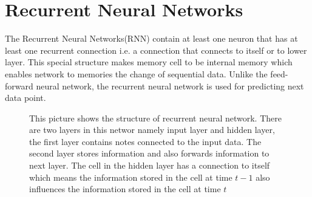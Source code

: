 \documentclass[officiallayout]{tktla}
\def\layersep{2.5cm}
\begin{document}
\section{Recurrent Neural Networks}
The Recurrent Neural Networks(RNN) contain at least one neuron that has at least one recurrent connection i.e. a connection that connects to itself or to lower layer. This special structure makes memory cell to be internal memory which enables network to memories the change of sequential data. Unlike the feed-forward neural network, the recurrent neural network is used for predicting next data point.

\begin{figure}[h!]
  \centering
  \caption{This picture shows the structure of recurrent neural network. There are two layers in this networ namely input layer and hidden layer, the first layer contains notes connected to the input data. The second layer stores information and also forwards information to next layer. The cell in the hidden layer has a connection to itself which means the information stored in the cell at time $t-1$ also influences the information stored in the cell at time $t$}\label{feedforward_nn}
\end{figure}
\end{document}
